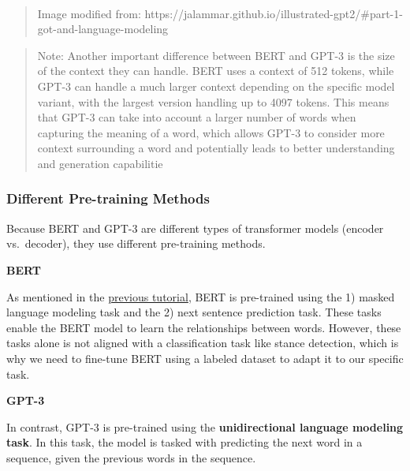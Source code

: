 \documentclass[11pt]{article}
\begin{document}
    \begin{center}
    \end{center}
    { \hspace*{\fill} \\}
    
    \begin{quote}
Image modified from:
https://jalammar.github.io/illustrated-gpt2/\#part-1-got-and-language-modeling
\end{quote}

    \begin{quote}
Note: Another important difference between BERT and GPT-3 is the size of
the context they can handle. BERT uses a context of 512 tokens, while
GPT-3 can handle a much larger context depending on the specific model
variant, with the largest version handling up to 4097 tokens. This means
that GPT-3 can take into account a larger number of words when capturing
the meaning of a word, which allows GPT-3 to consider more context
surrounding a word and potentially leads to better understanding and
generation capabilitie
\end{quote}

    \hypertarget{different-pre-training-methods}{%
\subsubsection{Different Pre-training
Methods}\label{different-pre-training-methods}}

Because BERT and GPT-3 are different types of transformer models
(encoder vs.~decoder), they use different pre-training methods.

\textbf{BERT}

As mentioned in the
\href{https://colab.research.google.com/drive/1nxziaKStwRnSyOLI6pLNBaAnB_aB6IsE?usp=sharing}{previous
tutorial}, BERT is pre-trained using the 1) masked language modeling
task and the 2) next sentence prediction task. These tasks enable the
BERT model to learn the relationships between words. However, these
tasks alone is not aligned with a classification task like stance
detection, which is why we need to fine-tune BERT using a labeled
dataset to adapt it to our specific task.

\textbf{GPT-3}

In contrast, GPT-3 is pre-trained using the \textbf{unidirectional
language modeling task}. In this task, the model is tasked with
predicting the next word in a sequence, given the previous words in the
sequence.
\end{document}
